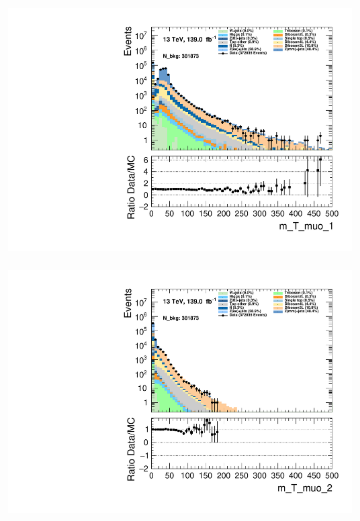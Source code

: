 \begin{figure}
\begin{subfigure}{.49\textwidth}
        \includegraphics[width=\textwidth]{Figures/MC_Data_comp/m_T_muo_1.pdf}
        \caption{ }
        \label{fig:fep}
    \end{subfigure}
    \hfill
    \begin{subfigure}{.49\textwidth}
        \includegraphics[width=\textwidth]{Figures/MC_Data_comp/m_T_muo_2.pdf}
        \caption{ }
        \label{fig:fe}
    \end{subfigure}
    \hfill       
    \caption{}
    \label{fig:t}
\end{figure}

